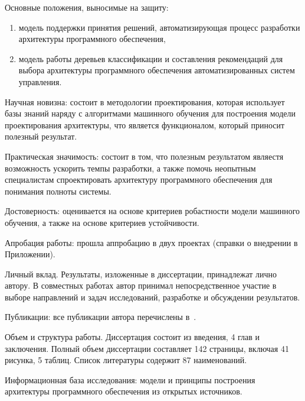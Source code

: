 Основные положения, выносимые на защиту:
\begin{enumerate}
\item модель поддержки принятия решений, автоматизирующая процесс разработки архитектуры программного обеспечения,
\item модель работы деревьев классификации и составления рекомендаций для выбора архитектуры программного обеспечения автоматизированных систем управления.
\end{enumerate}


Научная новизна: состоит в методологии проектирования, которая использует базы знаний наряду с алгоритмами машинного обучения для построения модели проектирования архитектуры, что является функционалом, который приносит полезный результат.

Практическая значимость: состоит в том, что полезным результатом являестя возможность ускорить темпы разработки, а также помочь неопытным специалистам спроектировать архитектуру программного обеспечения для понимания полноты системы.

Достоверность: оценивается на основе критериев робастности модели машинного обучения, а также на основе критериев устойчивости.

Апробация работы: прошла аппробацию в двух проектах (справки о внедрении в Приложении).

Личный вклад. Результаты, изложенные в диссертации, принадлежат лично автору. В совместных работах автор принимал непосредственное участие в выборе направлений и задач исследований, разработке и обсуждении результатов.

Публикации: все публикации автора перечислены в~\cite{aaij2022searches, baptista2021angular, leite2021observation,baptista2021searches,collaboration2021measurement,baptista2021measurement,aaij2021precision,aaij2022identification,bediaga2020measurement, aaij2021constraints,   onderwater2020study, aaij2022arxiv,     aaij2019arxiv,aaij2021evidence,aaij2020aps,baptista2021observation,baptista2021search,aaij2020isospin,  aaij2019precision,aaij2019search, lhcb2108evidence,aaij2022study,         aaij2022first,aaij2022j,  aaij2022observation, aaij2022tests}.

Объем и структура работы. Диссертация состоит из введения, 4 глав и заключения. Полный объем диссертации составляет 142 страницы, включая 41 рисунка, 5 таблиц. Список литературы содержит 87 наименований.

Информационная база исследования: модели и принципы построения архитектуры программного обеспечения из открытых источников.

